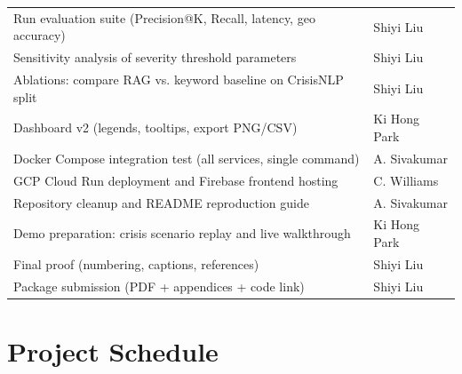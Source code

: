 \documentclass[conference]{IEEEtran}
\begin{document}
\begin{table}[h]
\begin{tabular}{p{5.0cm} p{2.5cm}}
Run evaluation suite (Precision@K, Recall, latency, geo accuracy) & Shiyi Liu \\
Sensitivity analysis of severity threshold parameters & Shiyi Liu \\
Ablations: compare RAG vs. keyword baseline on CrisisNLP split & Shiyi Liu \\
Dashboard v2 (legends, tooltips, export PNG/CSV) & Ki Hong Park \\
Docker Compose integration test (all services, single command) & A. Sivakumar \\
GCP Cloud Run deployment and Firebase frontend hosting & C. Williams \\
Repository cleanup and README reproduction guide & A. Sivakumar \\
Demo preparation: crisis scenario replay and live walkthrough & Ki Hong Park \\
Final proof (numbering, captions, references) & Shiyi Liu \\
Package submission (PDF + appendices + code link) & Shiyi Liu \\
\bottomrule
\end{tabular}
\end{table}

\section{Project Schedule}
\end{document}
